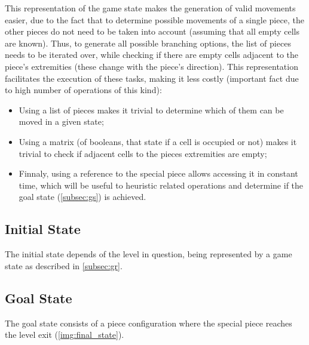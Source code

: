 \documentclass[conference]{IEEEtran}
\begin{document}
This representation of the game state makes the generation of valid movements easier, due to the fact that to determine possible movements of a single piece, the other pieces do not need to be taken into account (assuming that all empty cells are known). Thus, to generate all possible branching options, the list of pieces needs to be iterated over, while checking if there are empty cells adjacent to the piece's extremities (these change with the piece's direction). This representation facilitates the execution of these tasks, making it less costly (important fact due to high number of operations of this kind):

\begin{itemize}
    \item Using a list of pieces makes it trivial to determine which of them can be moved in a given state;
    \item Using a matrix (of booleans, that state if a cell is occupied or not) makes it trivial to check if adjacent cells to the pieces extremities are empty;
    \item Finnaly, using a reference to the special piece allows accessing it in constant time, which will be useful to heuristic related operations and determine if the goal state (\autoref{subsec:gs}) is achieved.
\end{itemize}

\subsection{Initial State}
The initial state depends of the level in question, being represented by a game state as described in \autoref{subsec:gr}.

\subsection{Goal State} \label{subsec:gs}
The goal state consists of a piece configuration where the special piece reaches the level exit (\autoref{img:final_state}).
\end{document}

